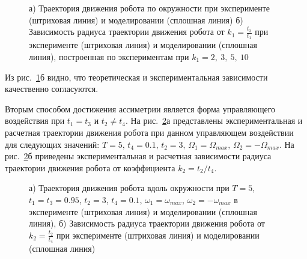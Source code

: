 \begin{figure}[!ht]
	\begin{minipage}[h]{0.25\linewidth}
	\end{minipage}
	\hfill
	\begin{minipage}[h]{0.6\linewidth}
	\end{minipage}
	\caption{а) Траектория движения робота по окружности при эксперименте (штриховая линия) и моделировании (сплошная линия)  б) Зависимость радиуса траектории движения робота от $k_1 = \frac{t_3}{t_1}$ при эксперименте (штриховая линия) и моделировании (сплошная линия), построенная по экспериментам при $k_1 = 2,\ 3,\ 5,\ 10$ }
	\label{CircleTrajectory}
\end{figure}


Из рис.~\ref{CircleTrajectory}б видно, что теоретическая и экспериментальная зависимости качественно согласуются. 

Вторым способом достижения ассиметрии является форма управляющего воздействия при $t_1 = t_3$ и $t_2 \neq t_4$. На рис.~\ref{ControlActionOur}а представлены экспериментальная и расчетная траектории движения робота при данном управляющем воздействии для следующих значений: $ T=5,\, t_4 = 0.1,\, t_2 = 3,\, \Omega_1 = \Omega_{max},\, \Omega_2 = -\Omega_{max} $. На рис.~\ref{ControlActionOur}б приведены экспериментальная и расчетная зависимости радиуса траектории движения робота от коэффициента $k_2 = t_2 / t_4$. 

\begin{figure}[!ht]
	\begin{minipage}[h]{0.5\linewidth}
	\end{minipage}
	\hfill
	\begin{minipage}[h]{0.5\linewidth}
	\end{minipage}
	\caption{а) Траектория движения робота вдоль окружности при $T = 5$, $t_1 = t_3 = 0.95$, $t_2 = 3$, $t_4 = 0.1$, $\omega_1 = \omega_{max}$, $\omega_2 = -\omega_{max}$ в эксперименте (штриховая линия) и моделировании (сплошная линия), б) Зависимость радиуса траектории движения робота от $k_2 = \frac{t_2}{t_4}$ при эксперименте (штриховая линия) и моделировании (сплошная линия)}
	\label{ControlActionOur}
\end{figure}

